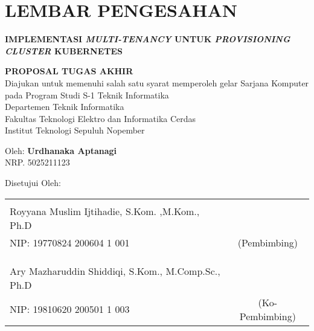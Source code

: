 \chapter*{LEMBAR PENGESAHAN}

\thispagestyle{empty}

\begin{center}
  \textbf{IMPLEMENTASI \emph{MULTI-TENANCY} UNTUK \emph{PROVISIONING CLUSTER} KUBERNETES}
\end{center}

\begingroup
\small

\begin{center}
  \textbf{PROPOSAL TUGAS AKHIR} \\
  Diajukan untuk memenuhi salah satu syarat memperoleh gelar
  Sarjana Komputer pada
  Program Studi S-1 Teknik Informatika \\
  Departemen Teknik Informatika \\
  Fakultas Teknologi Elektro dan Informatika Cerdas \\
  Institut Teknologi Sepuluh Nopember
\end{center}

\begin{center}
  Oleh: \textbf{Urdhanaka Aptanagi} \\
  NRP. 5025211123
\end{center}

\begin{center}
  Disetujui Oleh:
\end{center}

\vspace{10ex}

\begingroup
\setlength{\tabcolsep}{0pt}

\noindent
\begin{tabularx}{\textwidth}{X c}
        &                 \\
  Royyana Muslim Ijtihadie, S.Kom. ,M.Kom., Ph.D      &                 \\
  NIP: 19770824 200604 1 001                          & (Pembimbing)    \\
                                                      &                 \\
                                                      &                 \\
                                                      &                 \\
  Ary Mazharuddin Shiddiqi, S.Kom., M.Comp.Sc., Ph.D  &                 \\
  NIP: 19810620 200501 1 003                          & (Ko-Pembimbing) \\
\end{tabularx}
\endgroup


